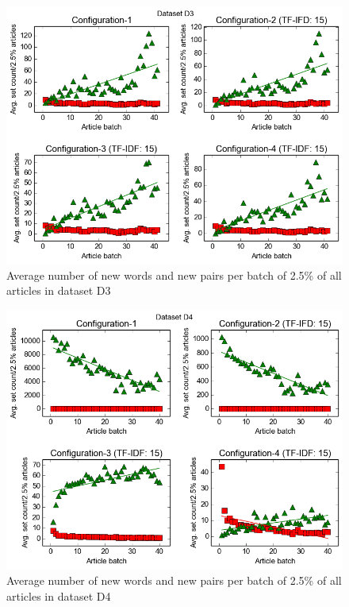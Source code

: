 \begin{figure}[ht]
  \centering
  \includegraphics[scale=0.70]{images/D3-plot.png}
  \caption{Average number of new words and new pairs per batch of 2.5\% of all articles in dataset D3}
  \label{fig:setPlot3}
\end{figure}

\begin{figure}[ht]
  \centering
  \includegraphics[scale=0.70]{images/D4-plot.png}
  \caption{Average number of new words and new pairs per batch of 2.5\% of all articles in dataset D4}
  \label{fig:setPlot4}
\end{figure}
